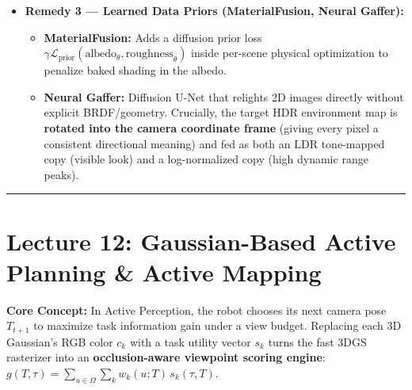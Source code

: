 \documentclass[10pt, a4paper]{article}
\newcommand{\hr}{\vspace{0.8em}\hrule\vspace{0.8em}}
\begin{document}
\begin{itemize}
    \begin{itemize}
        \item \textbf{Linearity of Light Transport:} Photons do not interact, so $I(c_A A + c_B B) = c_A I_A + c_B I_B$ (in linear HDR space). Capturing \textbf{One Light at a Time (OLAT)} images $I_k$ builds the light-transport matrix $T = [I_1 \mid \cdots \mid I_K]$; relighting under any new environment $\ell$ is a simple weighted sum $I_{\text{new}} = \sum_k \ell_k I_k$ with \textbf{zero BRDF or geometry estimation} (requires a static subject in a light stage).
    \end{itemize}
    \item \textbf{Remedy 3 --- Learned Data Priors (MaterialFusion, Neural Gaffer):}
    \begin{itemize}
        \item \textbf{MaterialFusion:} Adds a diffusion prior loss $\gamma\mathcal{L}_{\text{prior}}(\text{albedo}_\theta, \text{roughness}_\theta)$ inside per-scene physical optimization to penalize baked shading in the albedo.
        \item \textbf{Neural Gaffer:} Diffusion U-Net that relights 2D images directly without explicit BRDF/geometry. Crucially, the target HDR environment map is \textbf{rotated into the camera coordinate frame} (giving every pixel a consistent directional meaning) and fed as both an LDR tone-mapped copy (visible look) and a log-normalized copy (high dynamic range peaks).
    \end{itemize}
\end{itemize}

\hr
\section*{\textcolor{primary}{Lecture 12: Gaussian-Based Active Planning \& Active Mapping}}
\textbf{Core Concept:} In Active Perception, the robot chooses its next camera pose $T_{t+1}$ to maximize task information gain under a view budget. Replacing each 3D Gaussian's RGB color $c_k$ with a task utility vector $s_k$ turns the fast 3DGS rasterizer into an \textbf{occlusion-aware viewpoint scoring engine}: $g(T,\tau) = \sum_{u\in\Omega}\sum_k w_k(u;T)\,s_k(\tau,T)$.
\end{document}
